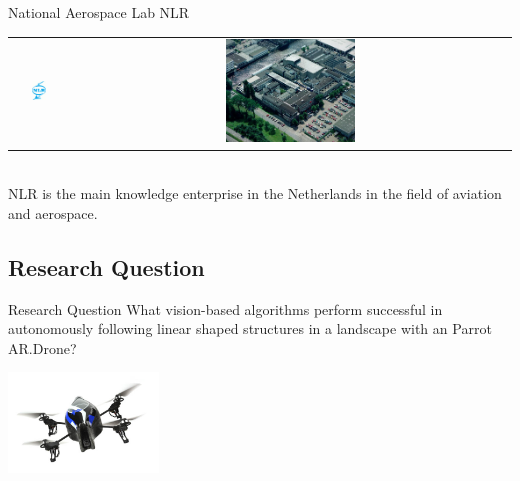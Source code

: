 \documentclass{beamer}
\begin{document}
\begin{frame}{National Aerospace Lab NLR}
\begin{center}
\begin{tabular}{ c c }
\includegraphics[width = 0.3\textwidth]{nlr_logo.jpg} & \includegraphics[width = 0.3\textwidth]{nlr_lucht.jpg}
\end{tabular}\\
NLR is the main knowledge enterprise in the Netherlands in the field of aviation and aerospace.
\end{center}
\end{frame}

\subsection{Research Question}
\begin{frame}
\begin{block}{Research Question}
What vision-based algorithms perform successful in autonomously following linear shaped structures in a landscape with an Parrot AR.Drone?
\end{block}
\begin{center}
\includegraphics[width = 0.3\textwidth]{ardrone.jpg}
\end{center}
\end{frame}
\end{document}
